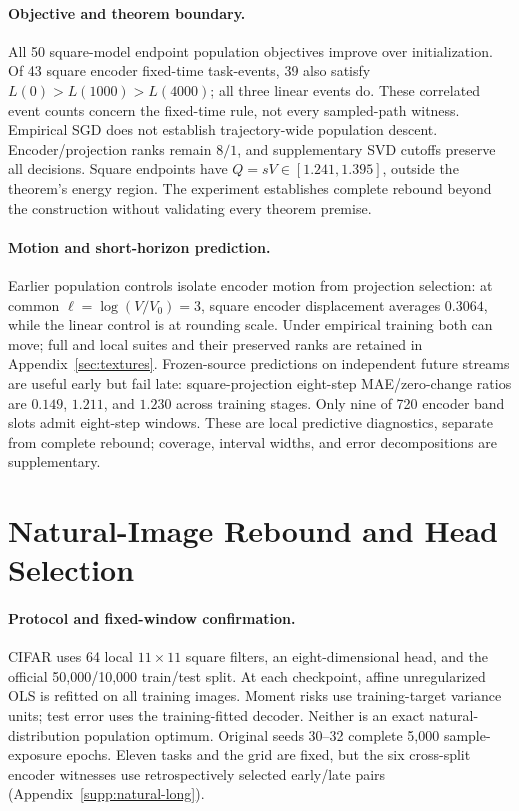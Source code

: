 \paragraph{Objective and theorem boundary.}
All 50 square-model endpoint population objectives improve over initialization. Of 43 square encoder fixed-time task-events, 39 also satisfy $L(0)>L(1000)>L(4000)$; all three linear events do. These correlated event counts concern the fixed-time rule, not every sampled-path witness. Empirical SGD does not establish trajectory-wide population descent. Encoder/projection ranks remain $8/1$, and supplementary SVD cutoffs preserve all decisions. Square endpoints have $Q=sV\in[1.241,1.395]$, outside the theorem's energy region. The experiment establishes complete rebound beyond the construction without validating every theorem premise.

\paragraph{Motion and short-horizon prediction.}
Earlier population controls isolate encoder motion from projection selection: at common $\ell=\log(V/V_0)=3$, square encoder displacement averages $0.3064$, while the linear control is at rounding scale. Under empirical training both can move; full and local suites and their preserved ranks are retained in Appendix~\ref{sec:textures}. Frozen-source predictions on independent future streams are useful early but fail late: square-projection eight-step MAE/zero-change ratios are $0.149$, $1.211$, and $1.230$ across training stages. Only nine of 720 encoder band slots admit eight-step windows. These are local predictive diagnostics, separate from complete rebound; coverage, interval widths, and error decompositions are supplementary.

\section{Natural-Image Rebound and Head Selection}
\label{main:natural-images}
\paragraph{Protocol and fixed-window confirmation.}
CIFAR uses 64 local $11\times11$ square filters, an eight-dimensional head, and the official 50,000/10,000 train/test split. At each checkpoint, affine unregularized OLS is refitted on all training images. Moment risks use training-target variance units; test error uses the training-fitted decoder. Neither is an exact natural-distribution population optimum. Original seeds 30--32 complete 5,000 sample-exposure epochs. Eleven tasks and the grid are fixed, but the six cross-split encoder witnesses use retrospectively selected early/late pairs (Appendix~\ref{supp:natural-long}).


